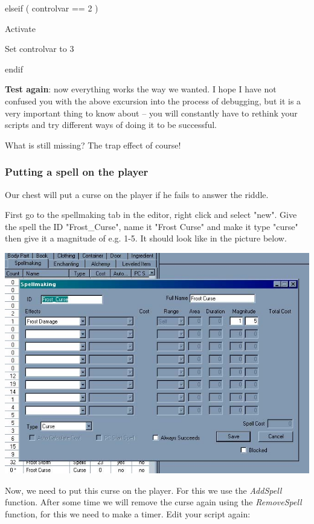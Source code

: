 
elseif ( controlvar == 2 )

Activate

Set controlvar to 3

endif

\textbf{Test again}: now everything works the way we wanted. I hope I have not confused you with the above excursion into the process of debugging, but it is a very important thing to know about -- you will constantly have to rethink your scripts and try different ways of doing it to be successful.

What is still missing? The trap effect of course!

\hypertarget{putting-a-spell-on-the-player}{%
\subsubsection{Putting a spell on the player}\label{putting-a-spell-on-the-player}}

Our chest will put a curse on the player if he fails to answer the riddle.

First go to the spellmaking tab in the editor, right click and select "new". Give the spell the ID "Frost\_Curse", name it "Frost Curse" and make it type "curse" then give it a magnitude of e.g. 1-5. It should look like in the picture below.

\includegraphics{media/image4.jpg}

Now, we need to put this curse on the player. For this we use the \emph{AddSpell} function. After some time we will remove the curse again using the \emph{RemoveSpell} function, for this we need to make a timer. Edit your script again:

